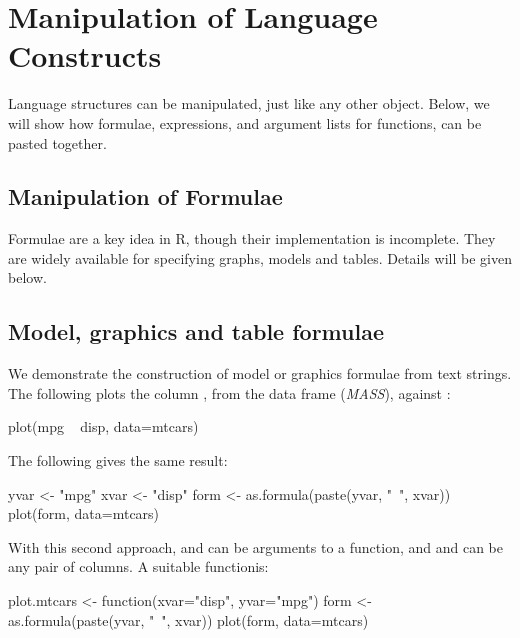 






\section{Manipulation of Language Constructs}

Language structures can be manipulated, just like any other object.
Below, we will show how formulae, expressions, and argument lists
for functions, can be pasted together.

\subsection{Manipulation of Formulae}

Formulae are a key idea in R, though their implementation is
incomplete. They are widely available for specifying graphs,
models and tables. Details will be given below.

\subsection*{Model, graphics and table formulae}
We demonstrate the construction of model or graphics formulae from
text strings. The following plots the column , from the data
frame  (\textit{MASS}), against :
\begin{Schunk}
\begin{Sinput}
plot(mpg ~ disp, data=mtcars)
\end{Sinput}
\end{Schunk}
The following gives the same result:
\begin{Schunk}
\begin{Sinput}
yvar <- "mpg"
xvar <- "disp"
form <- as.formula(paste(yvar, "~", xvar))
plot(form, data=mtcars)
\end{Sinput}
\end{Schunk}
With this second approach,  and 
can be arguments to a function, and  and
 can be any pair of columns.  A suitable
functionis:
\begin{Schunk}
\begin{Sinput}
plot.mtcars <- function(xvar="disp", yvar="mpg"){
    form <- as.formula(paste(yvar, "~", xvar))
    plot(form, data=mtcars)
}
\end{Sinput}
\end{Schunk}


